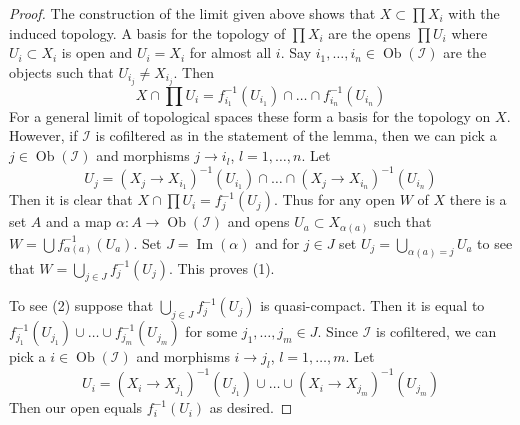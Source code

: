 \documentclass[10pt,a4paper]{amsart}
\theoremstyle{plain}
\theoremstyle{definition}
\theoremstyle{remark}
\numberwithin{equation}{subsection}
\def\Ob{\mathop{\mathrm{Ob}}\nolimits}
\def\Im{\mathop{\mathrm{Im}}}
\begin{document}
\begin{proof}
The construction of the limit given above shows that $X \subset \prod X_i$
with the induced topology. A basis for the topology of $\prod X_i$ are
the opens $\prod U_i$ where $U_i \subset X_i$ is open and $U_i = X_i$
for almost all $i$. Say $i_1, \ldots, i_n \in \Ob(\mathcal{I})$ are the
objects such that $U_{i_j} \not = X_{i_j}$. Then
$$
X \cap \prod U_i = f_{i_1}^{-1}(U_{i_1}) \cap \ldots \cap f_{i_n}^{-1}(U_{i_n})
$$
For a general limit of topological spaces these form a basis for the
topology on $X$. However, if $\mathcal{I}$ is cofiltered as in the statement
of the lemma, then we can pick a $j \in \Ob(\mathcal{I})$ and morphisms
$j \to i_l$, $l = 1, \ldots, n$. Let
$$
U_j =
(X_j \to X_{i_1})^{-1}(U_{i_1}) \cap \ldots \cap
(X_j \to X_{i_n})^{-1}(U_{i_n})
$$
Then it is clear that $X \cap \prod U_i = f_j^{-1}(U_j)$. Thus for any open
$W$ of $X$ there is a set $A$ and a map $\alpha : A \to \Ob(\mathcal{I})$ and
opens $U_a \subset X_{\alpha(a)}$ such that
$W = \bigcup f_{\alpha(a)}^{-1}(U_a)$. Set $J = \Im(\alpha)$ and
for $j \in J$ set $U_j = \bigcup_{\alpha(a) = j} U_a$ to see that
$W = \bigcup_{j \in J} f_j^{-1}(U_j)$.
This proves (1).

\medskip\noindent
To see (2) suppose that $\bigcup_{j \in J} f_j^{-1}(U_j)$ is quasi-compact.
Then it is equal to
$f_{j_1}^{-1}(U_{j_1}) \cup \ldots \cup f_{j_m}^{-1}(U_{j_m})$
for some $j_1, \ldots, j_m \in J$. Since $\mathcal{I}$ is cofiltered,
we can pick a $i \in \Ob(\mathcal{I})$ and morphisms
$i \to j_l$, $l = 1, \ldots, m$. Let
$$
U_i =
(X_i \to X_{j_1})^{-1}(U_{j_1}) \cup \ldots \cup
(X_i \to X_{j_m})^{-1}(U_{j_m})
$$
Then our open equals $f_i^{-1}(U_i)$ as desired. 
\end{proof}
\end{document}
